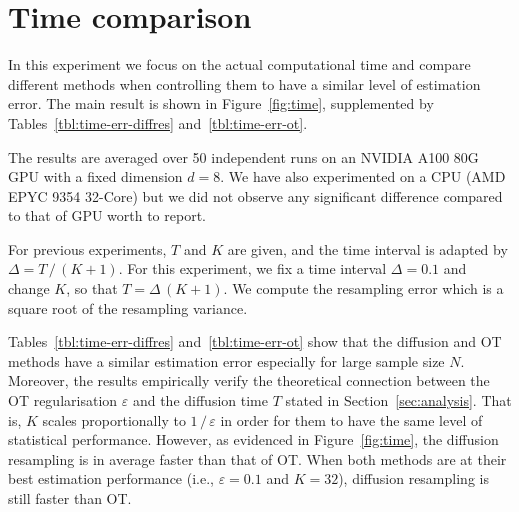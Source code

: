 \documentclass{article}
\begin{document}
\section{Time comparison}
\label{app:time}
In this experiment we focus on the actual computational time and compare different methods when controlling them to have a similar level of estimation error. 
The main result is shown in Figure~\ref{fig:time}, supplemented by Tables~\ref{tbl:time-err-diffres} and~\ref{tbl:time-err-ot}. 

The results are averaged over 50 independent runs on an NVIDIA A100 80G GPU with a fixed dimension $d=8$.
We have also experimented on a CPU (AMD EPYC 9354 32-Core) but we did not observe any significant difference compared to that of GPU worth to report. 

For previous experiments, $T$ and $K$ are given, and the time interval is adapted by $\Delta = T \, / \,(K + 1)$. 
For this experiment, we fix a time interval $\Delta =0.1$ and change $K$, so that $T = \Delta \, (K + 1)$. 
We compute the resampling error which is a square root of the resampling variance. 

Tables~\ref{tbl:time-err-diffres} and~\ref{tbl:time-err-ot} show that the diffusion and OT methods have a similar estimation error especially for large sample size $N$. 
Moreover, the results empirically verify the theoretical connection between the OT regularisation $\varepsilon$ and the diffusion time $T$ stated in Section~\ref{sec:analysis}. 
That is, $K$ scales proportionally to $1 \, / \, \varepsilon$ in order for them to have the same level of statistical performance. 
However, as evidenced in Figure~\ref{fig:time}, the diffusion resampling is in average faster than that of OT.
When both methods are at their best estimation performance (i.e., $\varepsilon=0.1$ and $K=32$), diffusion resampling is still faster than OT. 
\end{document}
